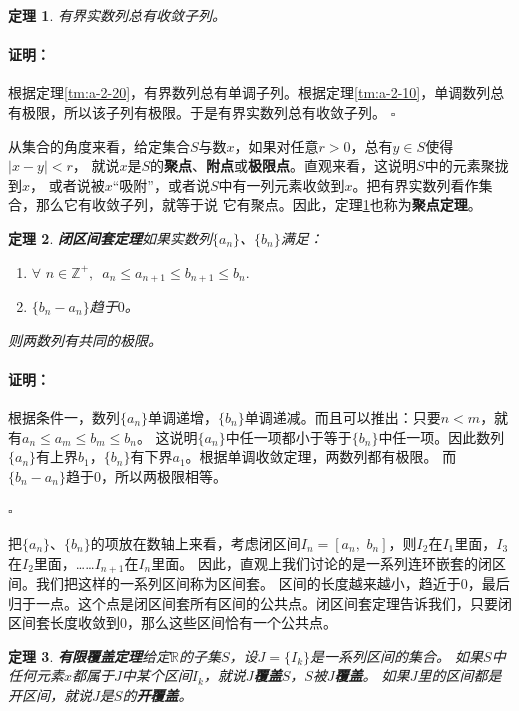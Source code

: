 \documentclass[12pt,UTF8]{ctexbook}
\newtheorem{tm}{定理}[section]
\renewenvironment{proof}{\paragraph{\textbf{证明：}}}{\hfill$\square$}
\begin{document}
\begin{appendix}
\begin{tm}\label{tm:a-2-30}
    有界实数列总有收敛子列。
\end{tm}
\begin{proof}
    根据定理\ref{tm:a-2-20}，有界数列总有单调子列。根据定理\ref{tm:a-2-10}，单调数列总有极限，所以该子列有极限。于是有界实数列总有收敛子列。
\end{proof}

从集合的角度来看，给定集合$S$与数$x$，如果对任意$r>0$，总有$y\in S$使得$|x - y| < r$，
就说$x$是$S$的\textbf{聚点}、\textbf{附点}或\textbf{极限点}。直观来看，这说明$S$中的元素聚拢到$x$，
或者说被$x$“吸附”，或者说$S$中有一列元素收敛到$x$。把有界实数列看作集合，那么它有收敛子列，就等于说
它有聚点。因此，定理\ref{tm:a-2-30}也称为\textbf{聚点定理}。

\begin{tm}\textbf{闭区间套定理}\label{tm:a-2-40}
    如果实数列$\{a_n\}$、$\{b_n\}$满足：
    \begin{enumerate}
        \item $\forall\,\, n\in\mathbb{Z}^+, \,\,\, a_n \leqslant a_{n+1} \leqslant b_{n+1} \leqslant b_n.$
        \item $\{b_n - a_n\}$趋于$0$。
    \end{enumerate}
    则两数列有共同的极限。
\end{tm}
\begin{proof}
    根据条件一，数列$\{a_n\}$单调递增，$\{b_n\}$单调递减。而且可以推出：只要$n<m$，就有$a_n \leqslant a_{m} \leqslant b_{m} \leqslant b_n$。
    这说明$\{a_n\}$中任一项都小于等于$\{b_n\}$中任一项。因此数列$\{a_n\}$有上界$b_1$，$\{b_n\}$有下界$a_1$。根据单调收敛定理，两数列都有极限。
    而$\{b_n - a_n\}$趋于$0$，所以两极限相等。

\end{proof}

把$\{a_n\}$、$\{b_n\}$的项放在数轴上来看，考虑闭区间$I_n = [a_{n},\,\, b_{n}]$，则$I_{2}$在$I_1$里面，$I_{3}$在$I_2$里面，……$I_{n+1}$在$I_n$里面。
因此，直观上我们讨论的是一系列连环嵌套的闭区间。我们把这样的一系列区间称为区间套。
区间的长度越来越小，趋近于$0$，最后归于一点。这个点是闭区间套所有区间的公共点。闭区间套定理告诉我们，只要闭区间套长度收敛到$0$，那么这些区间恰有一个公共点。

\begin{tm}\textbf{有限覆盖定理}\label{tm:a-2-50}
    给定$\mathbb{R}$的子集$S$，设$J = \{I_k\}$是一系列区间的集合。
    如果$S$中任何元素$x$都属于$J$中某个区间$I_k$，就说$J$\textbf{覆盖}$S$，$S$被$J$\textbf{覆盖}。
    如果$J$里的区间都是开区间，就说$J$是$S$的\textbf{开覆盖}。
    

\end{tm}
\end{appendix}
\end{document}

